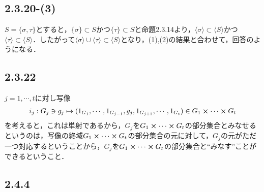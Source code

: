 \documentclass[uplatex,dvipdfmx,a4paper,11pt]{jsarticle}
\newenvironment{tleftbar}{\begin{tbleftline}\setlength{\parindent}{1zw}}{\end{tbleftline}}
\begin{document}
\subsection*{2.3.20-(3)}

\begin{tleftbar}
    $S=\{\sigma,\tau\}$とすると，$\{\sigma\}\subset S$かつ$\{\tau\}\subset S$と命題2.3.14より，$\langle {\sigma} \rangle \subset \langle S \rangle$かつ$\langle {\tau} \rangle \subset \langle S \rangle$．したがって$\langle {\sigma} \rangle  \cup \langle {\tau} \rangle \subset \langle S \rangle$となり，(1),(2)の結果と合わせて，回答のようになる． 
\end{tleftbar}


\subsection*{2.3.22}

\begin{tleftbar}
    $j=1,\cdots,t$に対し写像
    \begin{align*}
        i_j:G_j\ni g_j \mapsto (1_{G_1},\cdots,1_{G_{j-1}},g_j,1_{G_{j+1}},\cdots,1_{G_t}) \in G_1\cross \cdots \cross  G_t
    \end{align*}  
    を考えると，これは単射であるから，$G_j$を$G_1\cross \cdots \cross  G_t$の部分集合とみなせるというのは，写像の終域$G_1\cross \cdots \cross  G_t$の部分集合の元に対して，$G_j$の元がただ一つ対応するということから，$G_j$を$G_1\cross \cdots \cross  G_t$の部分集合と``みなす''ことができるということ．
\end{tleftbar}


\subsection*{2.4.4}

\end{document}
